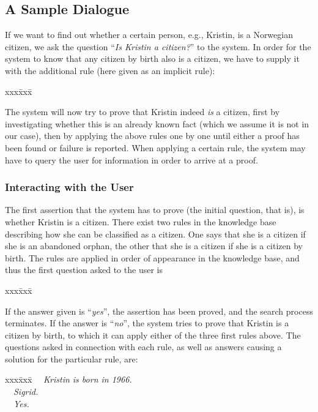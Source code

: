 \subsection{A Sample Dialogue}

If we want to find out whether a certain person, e.g., Kristin, is a
Norwegian citizen, we ask the question ``{\em Is Kristin a
citizen?\/}'' to the system. In order for the system to know that any
citizen by birth also is a citizen, we have to supply it with the
additional rule (here given as an implicit rule):

\begin{tabbing}
  xxx\= xxx\= \kill
  \>
\end{tabbing}

The system will now try to prove that Kristin indeed {\em is\/} a
citizen, first by investigating whether this is an already known fact
(which we assume it is not in our case), then by applying the above
rules one by one until either a proof has been found or failure is
reported. When applying a certain rule, the system may have to query
the user for information in order to arrive at a proof.

\subsubsection{Interacting with the User}

The first assertion that the system has to prove (the initial
question, that is), is whether Kristin is a citizen. There exist two
rules in the knowledge base describing how she can be classified as a
citizen. One says that she is a citizen if she is an abandoned orphan,
the other that she is a citizen if she is a citizen by birth. The
rules are applied in order of appearance in the knowledge base, and
thus the first question asked to the user is

\begin{tabbing}
  xxx\= xxx\= \kill
  \>
\end{tabbing}
If the answer given is ``{\em yes\/}'', the assertion has been proved,
and the search process terminates. If the answer is ``{\em no\/}'',
the system tries to prove that Kristin is a citizen by birth, to which
it can apply either of the three first rules above. The questions
asked in connection with each rule, as well as answers causing a
solution for the particular rule, are:

\begin{tabbing}
  xxx\= xxx\= \kill
  \>\ \ {\sl Kristin is born in 1966.}\\
  \>\ \ {\sl Sigrid.}\\
  \>\ \ {\sl Yes.}
\end{tabbing}

